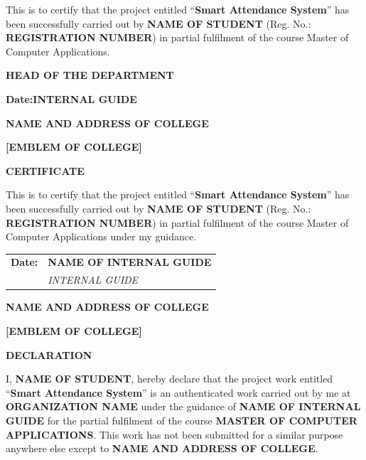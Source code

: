 \documentclass[12pt,a4paper]{report}
\newcommand{\ProjectTitleTitleCase}{Smart Attendance System}
\newcommand{\StudentName}{NAME OF STUDENT}
\newcommand{\RegisterNumber}{REGISTRATION NUMBER}
\newcommand{\GuideName}{NAME OF INTERNAL GUIDE}
\newcommand{\CollegeName}{NAME AND ADDRESS OF COLLEGE}
\newcommand{\ProjectCompany}{ORGANIZATION NAME}
\newcommand{\frontmatterpage}{\clearpage\thispagestyle{empty}}
\begin{document}
\vspace{0.8cm}
This is to certify that the project entitled ``\textbf{\ProjectTitleTitleCase}'' has been successfully carried out by \textbf{\StudentName} (Reg. No.: \textbf{\RegisterNumber}) in partial fulfilment of the course Master of Computer Applications.

\vfill
\begin{flushright}
\textbf{HEAD OF THE DEPARTMENT}
\end{flushright}

\vspace{0.8cm}
\textbf{Date:}\hfill\textbf{INTERNAL GUIDE}

\frontmatterpage
\begin{center}
\textbf{\CollegeName}

\vspace{1.1cm}
\textbf{[EMBLEM OF COLLEGE]}

\vspace{1.1cm}
\textbf{CERTIFICATE}
\end{center}

\vspace{0.8cm}
This is to certify that the project entitled ``\textbf{\ProjectTitleTitleCase}'' has been successfully carried out by \textbf{\StudentName} (Reg. No.: \textbf{\RegisterNumber}) in partial fulfilment of the course Master of Computer Applications under my guidance.

\vfill
\begin{tabular}{p{}p{}}
\textbf{Date:} & \raggedleft\textbf{\GuideName}\\
& \raggedleft\textit{INTERNAL GUIDE}
\end{tabular}

\frontmatterpage
\begin{center}
\textbf{\CollegeName}

\vspace{1.1cm}
\textbf{[EMBLEM OF COLLEGE]}

\vspace{1.1cm}
\textbf{DECLARATION}
\end{center}

\vspace{0.8cm}
I, \textbf{\StudentName}, hereby declare that the project work entitled ``\textbf{\ProjectTitleTitleCase}'' is an authenticated work carried out by me at \textbf{\ProjectCompany} under the guidance of \textbf{\GuideName} for the partial fulfilment of the course \textbf{MASTER OF COMPUTER APPLICATIONS}. This work has not been submitted for a similar purpose anywhere else except to \textbf{\CollegeName}.
\end{document}

